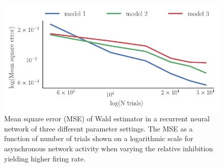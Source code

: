 \documentclass[11pt]{article}
\begin{document}
\begin{figure}
\includegraphics[scale=1]{mse_pos}
\caption{Mean square error (MSE) of Wald estimator in a recurrent neural network of three different parameter settings. The MSE as a function of number of trials shown on a logarithmic scale for asynchronous network activity when varying the relative inhibition yielding higher firing rate. \label{fig:error}}
\end{figure}
\end{document}
